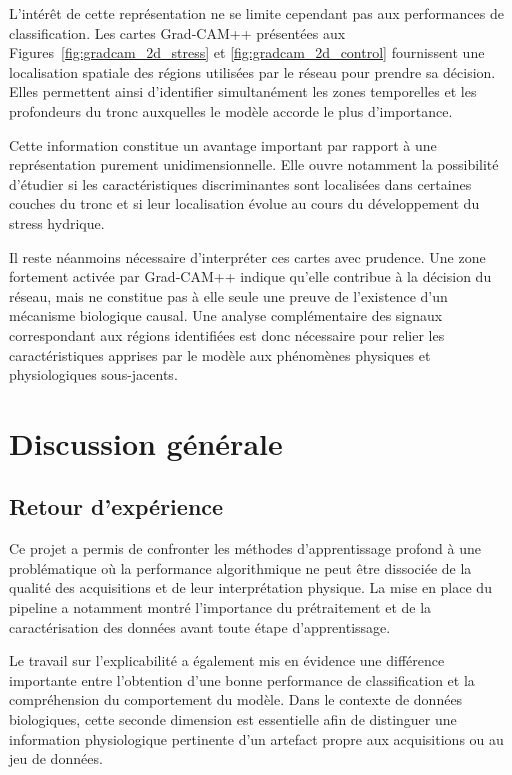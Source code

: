 \documentclass[12pt,a4paper,twoside]{article}
\begin{document}
L'intérêt de cette représentation ne se limite cependant pas aux performances de classification. Les cartes Grad-CAM++ présentées aux Figures~\ref{fig:gradcam_2d_stress} et \ref{fig:gradcam_2d_control} fournissent une localisation spatiale des régions utilisées par le réseau pour prendre sa décision. Elles permettent ainsi d'identifier simultanément les zones temporelles et les profondeurs du tronc auxquelles le modèle accorde le plus d'importance.

Cette information constitue un avantage important par rapport à une représentation purement unidimensionnelle. Elle ouvre notamment la possibilité d'étudier si les caractéristiques discriminantes sont localisées dans certaines couches du tronc et si leur localisation évolue au cours du développement du stress hydrique.

Il reste néanmoins nécessaire d'interpréter ces cartes avec prudence. Une zone fortement activée par Grad-CAM++ indique qu'elle contribue à la décision du réseau, mais ne constitue pas à elle seule une preuve de l'existence d'un mécanisme biologique causal. Une analyse complémentaire des signaux correspondant aux régions identifiées est donc nécessaire pour relier les caractéristiques apprises par le modèle aux phénomènes physiques et physiologiques sous-jacents.
\section{Discussion générale}
\label{sec:discussion}

\subsection{Retour d'expérience}

Ce projet a permis de confronter les méthodes d'apprentissage profond à une
problématique où la performance algorithmique ne peut être dissociée de la
qualité des acquisitions et de leur interprétation physique. La mise en place
du pipeline a notamment montré l'importance du prétraitement et de la
caractérisation des données avant toute étape d'apprentissage.

Le travail sur l'explicabilité a également mis en évidence une différence
importante entre l'obtention d'une bonne performance de classification et la
compréhension du comportement du modèle. Dans le contexte de données
biologiques, cette seconde dimension est essentielle afin de distinguer une
information physiologique pertinente d'un artefact propre aux acquisitions ou
au jeu de données.
\end{document}
